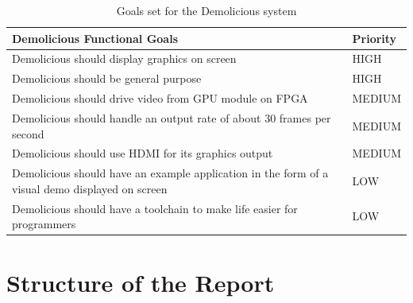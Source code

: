 \documentclass[../main/report.tex]{subfiles}
\begin{document}
\begin{table}[htp]
    \centering
    \begin{tabular}{|p{8cm}|l|}
        \hline
        \textbf{Demolicious Functional Goals}                & \textbf{Priority} \\ \hline
        Demolicious should display graphics on screen                           & HIGH    \\ \hline
        Demolicious should be general purpose                                   & HIGH    \\ \hline
        Demolicious should drive video from GPU module on FPGA                  & MEDIUM  \\ \hline
        Demolicious should handle an output rate of about 30 frames per second  & MEDIUM  \\ \hline
        Demolicious should use HDMI for its graphics output	                    & MEDIUM  \\ \hline
        Demolicious should have an example application in the form of a visual demo displayed on screen & LOW \\ \hline
        Demolicious should have a toolchain to make life easier for programmers & LOW     \\ \hline
    \end{tabular}
    \caption{Goals set for the Demolicious system}
    \label{tab:goals}
\end{table}

\newpage
\section{Structure of the Report}

\end{document}
